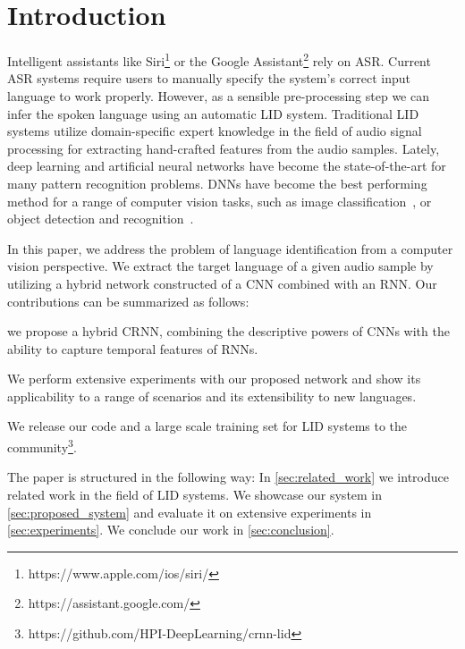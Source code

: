 \documentclass{llncs}
\begin{document}
\section{Introduction}

Intelligent assistants like Siri\footnote{https://www.apple.com/ios/siri/} or the Google Assistant\footnote{https://assistant.google.com/} rely on \ac{ASR}.
Current \ac{ASR} systems require users to manually specify the system's correct input language to work properly. However, as a sensible pre-processing step we can infer the spoken language using an automatic \ac{LID} system.
Traditional \ac{LID} systems utilize domain-specific expert knowledge in the field of audio signal processing for extracting hand-crafted features from the audio samples.
Lately, deep learning and artificial neural networks have become the state-of-the-art for many pattern recognition problems.
\acp{DNN} have become the best performing method for a range of computer vision tasks, such as image classification~\cite{Simonyan2015Very,Szegedy2016Rethinking}, or object detection and recognition~\cite{Redmon2016You,Ren2015Faster}.

In this paper, we address the problem of language identification from a computer vision perspective.
We extract the target language of a given audio sample by utilizing a hybrid network constructed of a \ac{CNN} combined with an \ac{RNN}.
Our contributions can be summarized as follows:
\begin{enumerate*}[label={(\arabic*)}]
	\item we propose a hybrid \ac{CRNN}, combining the descriptive powers of \acp{CNN} with the ability to capture temporal features of \acp{RNN}.
	\item We perform extensive experiments with our proposed network and show its applicability to a range of scenarios and its extensibility to new languages.
	\item We release our code and a large scale training set for \ac{LID} systems to the community\footnote{https://github.com/HPI-DeepLearning/crnn-lid}.
\end{enumerate*}

The paper is structured in the following way:
In \autoref{sec:related_work} we introduce related work in the field of \ac{LID} systems.
We showcase our system in \autoref{sec:proposed_system} and evaluate it on extensive experiments in \autoref{sec:experiments}.
We conclude our work in \autoref{sec:conclusion}.
\end{document}
